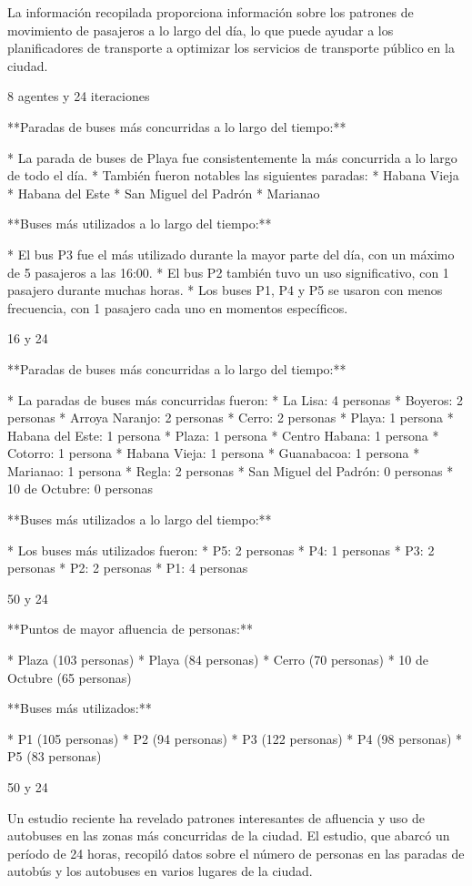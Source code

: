 \documentclass{article}
\begin{document}
La información recopilada proporciona información sobre los patrones de movimiento de pasajeros a lo largo del día, lo que puede ayudar a los planificadores de transporte a optimizar los servicios de transporte público en la ciudad.

8 agentes y 24 iteraciones

**Paradas de buses más concurridas a lo largo del tiempo:**

* La parada de buses de Playa fue consistentemente la más concurrida a lo largo de todo el día.
* También fueron notables las siguientes paradas:
    * Habana Vieja
    * Habana del Este
    * San Miguel del Padrón
    * Marianao

**Buses más utilizados a lo largo del tiempo:**

* El bus P3 fue el más utilizado durante la mayor parte del día, con un máximo de 5 pasajeros a las 16:00.
* El bus P2 también tuvo un uso significativo, con 1 pasajero durante muchas horas.
* Los buses P1, P4 y P5 se usaron con menos frecuencia, con 1 pasajero cada uno en momentos específicos.

16 y 24

**Paradas de buses más concurridas a lo largo del tiempo:**

* La paradas de buses más concurridas fueron:
    * La Lisa: 4 personas
    * Boyeros: 2 personas
    * Arroya Naranjo: 2 personas
    * Cerro: 2 personas
    * Playa: 1 persona
    * Habana del Este: 1 persona
    * Plaza: 1 persona
    * Centro Habana: 1 persona
    * Cotorro: 1 persona
    * Habana Vieja: 1 persona
    * Guanabacoa: 1 persona
    * Marianao: 1 persona
    * Regla: 2 personas
    * San Miguel del Padrón: 0 personas
    * 10 de Octubre: 0 personas

**Buses más utilizados a lo largo del tiempo:**

* Los buses más utilizados fueron:
    * P5: 2 personas
    * P4: 1 personas
    * P3: 2 personas
    * P2: 2 personas
    * P1: 4 personas


50 y 24

**Puntos de mayor afluencia de personas:**

* Plaza (103 personas)
* Playa (84 personas)
* Cerro (70 personas)
* 10 de Octubre (65 personas)

**Buses más utilizados:**

* P1 (105 personas)
* P2 (94 personas)
* P3 (122 personas)
* P4 (98 personas)
* P5 (83 personas)

50 y 24

Un estudio reciente ha revelado patrones interesantes de afluencia y uso de autobuses en las zonas más concurridas de la ciudad. El estudio, que abarcó un período de 24 horas, recopiló datos sobre el número de personas en las paradas de autobús y los autobuses en varios lugares de la ciudad.
\end{document}
